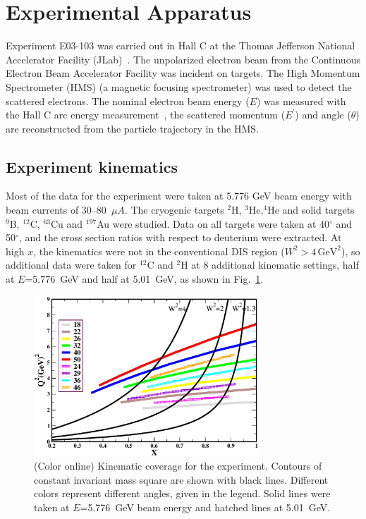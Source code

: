 \section{Experimental Apparatus}\label{apparatus.sec}

Experiment E03-103 was carried out in Hall C at the Thomas Jefferson National
Accelerator Facility (JLab)~\cite{Leemann:2001dg}. The unpolarized
electron beam from the Continuous Electron Beam Accelerator Facility was
incident on targets. The High Momentum Spectrometer (HMS) (a magnetic focusing
spectrometer) was used to detect the scattered electrons. The nominal electron
beam energy ($E$) was measured with the Hall C arc energy
measurement~\cite{XX}, the scattered momentum ($E^{'}$) and angle ($\theta$)
are reconstructed from the particle trajectory in the HMS.


 
\subsection{Experiment kinematics}\label{exptkinem.ssec}

Most of the data for the experiment were taken at 5.776 GeV beam energy with
beam currents of 30--80~$\mu A$. The cryogenic targets $^2$H, $^3$He,$^4$He
and solid targets $^9$B, $^{12}$C, $^{63}$Cu and $^{197}$Au were studied. Data
on all targets were taken at 40$\ensuremath{^\circ}$ and
50$\ensuremath{^\circ}$, and the cross section ratios with respect to
deuterium were extracted. At high $x$, the kinematics were not in the
conventional DIS region ($W^2>4\,\mathrm{GeV^2}$), so additional data were
taken for $^{12}$C and $^2$H at 8 additional kinematic settings, half at
$E$=5.776~GeV and half at 5.01~GeV, as shown in Fig.~\ref{xemkinem_fig}.

\begin{figure}[htb]
\begin{center}
\includegraphics[height=60mm,angle=0]{plots/phasespaceXbj.eps}
\caption{(Color online) Kinematic coverage for the experiment. Contours of
constant invariant mass square are shown with black lines. Different colors
represent different angles, given in the legend. Solid lines were taken at
$E$=5.776~GeV beam energy and hatched lines at 5.01~GeV.}
\label{xemkinem_fig}
\end{center}
\end{figure}

